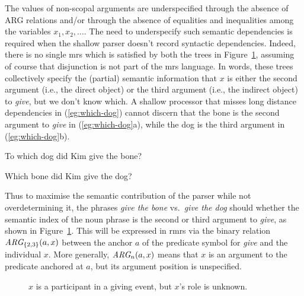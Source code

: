 The values of non-scopal arguments are underspecified through the
absence of ARG relations and/or through the absence of
equalities and inequalities among the variables $x_1, x_2,\ldots$.
The need to
underspecify such semantic dependencies is required when
the shallow parser doesn't record syntactic dependencies.
Indeed, there is no single {\sc mrs} which is satisfied by both the
trees in Figure~\ref{fig:2}, assuming of course that disjunction is not part of
the {\sc mrs} language.  In words, these trees collectively specify
the (partial) semantic information that $x$ is either the second
argument (i.e., the direct object) or the third argument (i.e., the
indirect object) to {\em give}, but we don't know which.  
A shallow
processor that misses long distance dependencies in
(\ref{eg:which-dog}) cannot
discern that the bone is the second argument to {\em
  give} in (\ref{eg:which-dog}a), while the dog is the third argument
in (\ref{eg:which-dog}b).
\begin{examples}
\item   \label{eg:which-dog}
\begin{subexamples}
\item   To which dog did Kim give the bone?
\item   Which bone did Kim give the dog?
\end{subexamples}
\end{examples}
Thus to maximise the semantic contribution
of the parser while not overdetermining it, the phrases
{\em give the bone} vs.\
{\em give the dog} should whether the semantic index of the noun
phrase is the second or third argument to {\em give},
as shown in Figure~\ref{fig:2}.   This will be expressed in
{\sc rmrs} via the binary relation  $\mbox{{\em ARG}}_{\{2,3\}}(a,x)$
between the anchor $a$ of the predicate symbol for {\em give} and the
individual $x$.   More generally, $\mbox{{\em ARG}}_n(a,x)$ means that
$x$ is an argument to the predicate anchored at $a$, but its argument
position is unspecified.

\begin{figure}

\leaf{$\ldots$}
\leaf{$\ldots$}
\tree
\hfill
{}
\leaf{$\ldots$}
\leaf{$\ldots$}
\tree

\caption{$x$ is a participant in a
  giving event, but $x$'s role is unknown.}
\label{fig:2}
\end{figure}

